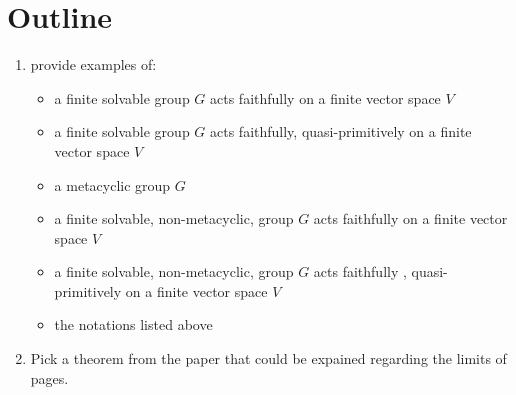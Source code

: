 \documentclass[a4paper]{article}
\theoremstyle{definition}
\begin{document}
\section{Outline}
\begin{enumerate}
	\item provide examples of: 
		\begin{itemize}
\item a finite solvable group $G$ acts faithfully on a finite vector space $V$ 
	\item a finite solvable group  $G$ acts faithfully, quasi-primitively on a finite vector space  $V$
	\item a metacyclic group $G$
\item a finite solvable, non-metacyclic, group $G$ acts faithfully on a finite vector space $V$ 
\item a finite solvable, non-metacyclic,  group $G$ acts faithfully , quasi-primitively on a finite vector space $V$
\item the notations listed above
\end{itemize}
\item Pick a theorem from the paper that could be expained regarding the limits of pages.
\end{enumerate}




\end{document}
